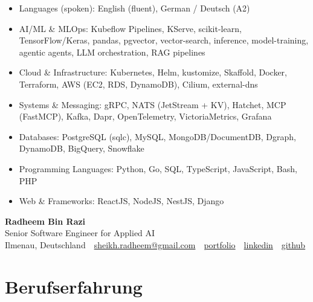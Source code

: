 \documentclass[10pt,a4paper]{resume}
\makeatletter
\newcommand{\Portfolio}{https://radheem.github.io/my-cv}
\newcommand{\PortfolioText}{portfolio}
\newcommand{\GitHub}{https://github.com/radheem}
\newcommand{\LinkedIn}{https://www.linkedin.com/in/radheem-razi}
\newcommand{\Email}{sheikh.radheem@gmail.com}
\makeatother
\begin{document}
\begin{itemize}[leftmargin=1.4em,nosep,topsep=2pt]
  \item Languages (spoken): English (fluent), German / Deutsch (A2)
  \item AI/ML \& MLOps: Kubeflow Pipelines, KServe, scikit-learn, TensorFlow/Keras, pandas, pgvector, vector-search, inference, model-training, agentic agents, LLM orchestration, RAG pipelines
  \item Cloud \& Infrastructure: Kubernetes, Helm, kustomize, Skaffold, Docker, Terraform, AWS (EC2, RDS, DynamoDB), Cilium, external-dns
  \item Systems \& Messaging: gRPC, NATS (JetStream + KV), Hatchet, MCP (FastMCP), Kafka, Dapr, OpenTelemetry, VictoriaMetrics, Grafana
  \item Databases: PostgreSQL (sqlc), MySQL, MongoDB/DocumentDB, Dgraph, DynamoDB, BigQuery, Snowflake
  \item Programming Languages: Python, Go, SQL, TypeScript, JavaScript, Bash, PHP
  \item Web \& Frameworks: ReactJS, NodeJS, NestJS, Django
\end{itemize}

\clearpage
{}

\begin{center}
  {\huge\bfseries Radheem Bin Razi}\\[3pt]
  {\large Senior Software Engineer for Applied AI}\\[6pt]
  \small
  Ilmenau, Deutschland \,\textbar\,
  \href{mailto:\Email}{\Email} \,\textbar\,
  \href{\Portfolio}{\PortfolioText} \,\textbar\,
  \href{\LinkedIn}{linkedin} \,\textbar\,
  \href{\GitHub}{github}
\end{center}
\vspace{2pt}

\section{Berufserfahrung}
\end{document}
